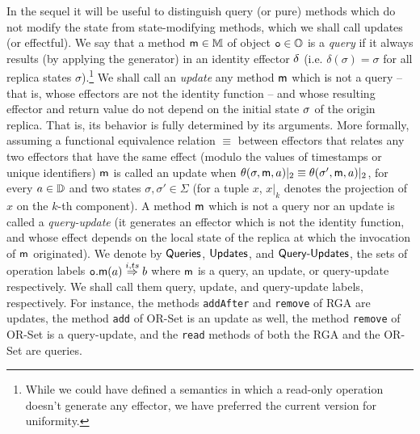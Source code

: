 In the sequel it will be useful to distinguish query (or pure) methods
which do not modify the state from state-modifying methods, which we
shall call updates (or effectful).
%
We say that a method $\mathsf{m}\in\mathbb{M}$ of object $\mathtt{o}\in \mathbb{O}$
is a \emph{query} if it always results (by applying the generator) in an identity effector $\delta$ (i.e.
$\delta(\sigma)=\sigma$ for all replica states
$\sigma$).\footnote{While we could have defined a semantics in which a
  read-only operation doesn't generate any effector, we have preferred
  the current version for uniformity.}
We shall call an \emph{update} any method $\mathsf{m}$ which is not a
query -- that is, whose effectors are not the identity function -- and
whose resulting effector and return value do not depend on the
initial state $\sigma$ of the origin replica.
That is, its behavior is fully determined by its arguments.
More formally, assuming a functional equivalence relation $\equiv$
between effectors that relates any two effectors that have the same
effect (modulo the values of timestamps or unique identifiers)
$\mathsf{m}$ is called an update when
$\theta(\sigma,\mathsf{m},a)|_2 \equiv
\theta(\sigma',\mathsf{m},a)|_2$, for every $a\in\mathbb{D}$
and two states $\sigma,\sigma'\in\Sigma$ (for a tuple $x$, $x|_k$
denotes the projection of $x$ on the $k$-th component).
A method $\mathsf{m}$ which is not a query nor an update is called a
\emph{query-update} (it generates an effector which is not the
identity function, and whose effect depends on the local state of the
replica at which the invocation of $\mathsf{m}$ originated).
We denote by $\mathsf{Queries}$, $\mathsf{Updates}$, and $\mathsf{Query\text{-}Updates}$, the sets of
operation labels ${{\mathtt{o}.\mathsf{m}}}(a) \overset{i,ts}{\Rightarrow} b$ where $\mathsf{m}$
is a query, an update, or query-update respectively.
We shall call them query, update, and query-update labels,
respectively. For instance, the methods \lstinline|addAfter| and
\lstinline|remove| of RGA are updates, the method \lstinline|add| of OR-Set is an update as well,
the method \lstinline|remove| of OR-Set is a query-update, and the \lstinline|read| methods of both the RGA and the OR-Set
are queries.

